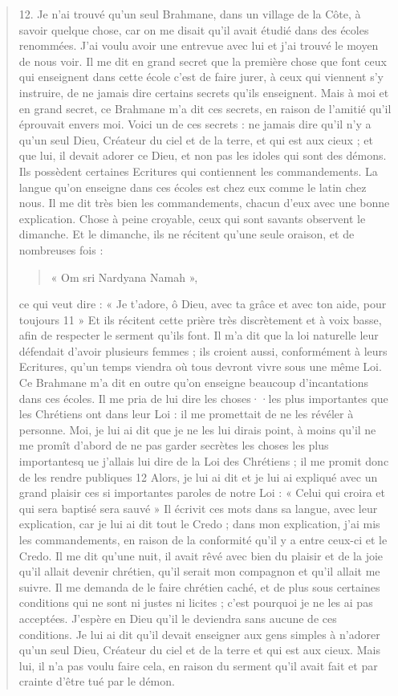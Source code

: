 \begin{quote}
12. Je n'ai trouvé qu'un seul Brahmane, dans un village de la
Côte, à savoir quelque chose, car on me disait qu'il avait étudié
dans des écoles renommées. J'ai voulu avoir une entrevue avec lui
et j'ai trouvé le moyen de nous voir. Il me dit en grand secret que
la première chose que font ceux qui enseignent dans cette école
c'est de faire jurer, à ceux qui viennent s'y instruire, de ne jamais
dire certains secrets qu'ils enseignent. Mais à moi et en grand
secret, ce Brahmane m'a dit ces secrets, en raison de l'amitié qu'il
éprouvait envers moi. Voici un de ces secrets : ne jamais dire qu'il
n'y a qu'un seul Dieu, Créateur du ciel et de la terre, et qui est aux
cieux ; et que lui, il devait adorer ce Dieu, et non pas les idoles
qui sont des démons. Ils possèdent certaines Ecritures qui contiennent
les commandements. La langue qu'on enseigne dans ces écoles
est chez eux comme le latin chez nous. Il me dit très bien les
commandements, chacun d'eux avec une bonne explication. Chose
à peine croyable, ceux qui sont savants observent le dimanche. Et
le dimanche, ils ne récitent qu'une seule oraison, et de nombreuses fois : \begin{quote}
    « Om sri Nardyana Namah »,
\end{quote} ce qui veut dire : « Je
t'adore, ô Dieu, avec ta grâce et avec ton aide, pour toujours 11 »
Et ils récitent cette prière très discrètement et à voix basse, afin de
respecter le serment qu'ils font. Il m'a dit que la loi naturelle leur
défendait d'avoir plusieurs femmes ; ils croient aussi, conformément
à leurs Ecritures, qu'un temps viendra où tous devront vivre
sous une même Loi. Ce Brahmane m'a dit en outre qu'on enseigne
beaucoup d'incantations dans ces écoles.
Il me pria de lui dire les choses··les plus importantes que les Chrétiens
ont dans leur Loi : il me promettait de ne les révéler à personne.
Moi, je lui ai dit que je ne les lui dirais point, à moins qu'il
ne me promît d'abord de ne pas garder secrètes les choses les plus
importantesq ue j'allais lui dire de la Loi des Chrétiens ; il me promit
donc de les rendre publiques 12 Alors, je lui ai dit et je lui ai 
  expliqué avec un grand plaisir ces si importantes paroles de notre
Loi : « Celui qui croira et qui sera baptisé sera sauvé   » Il écrivit
ces mots dans sa langue, avec leur explication, car je lui ai dit
tout le Credo ; dans mon explication, j'ai mis les commandements,
en raison de la conformité qu'il y a entre ceux-ci et le Credo. Il
me dit qu'une nuit, il avait rêvé avec bien du plaisir et de la joie
qu'il allait devenir chrétien, qu'il serait mon compagnon et qu'il
allait me suivre. Il me demanda de le faire chrétien caché, et de
plus sous certaines conditions qui ne sont ni justes ni licites ; c'est
pourquoi je ne les ai pas acceptées. J'espère en Dieu qu'il le deviendra
sans aucune de ces conditions. Je lui ai dit qu'il devait enseigner
aux gens simples à n'adorer qu'un seul Dieu, Créateur du ciel
et de la terre et qui est aux cieux. Mais lui, il n'a pas voulu faire
cela, en raison du serment qu'il avait fait et par crainte d'être tué
par le démon.



\end{quote}
